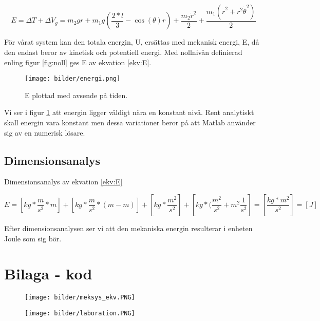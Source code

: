 \documentclass[a4paper,12pt]{article}
\begin{document}
\begin{equation}
E = \Delta{T} + \Delta{V_g} = m_2gr + m_1g(\frac{2*l}{3}-\cos(\theta)r) + \frac{m_2\dot{r}^2}{2} + \frac{m_1(\dot{r}^2+r^2\dot{\theta}^2)}{2}
\label{ekv:E}
\end{equation}

För vårat system kan den totala energin, U, ersättas med mekanisk energi, E, då den endast beror av kinetisk och potentiell energi. Med nollnivån definierad enling figur \ref{fig:noll} ges E av ekvation  \ref{ekv:E}.

\begin{figure}[h!]
\centering
\texttt{[image: bilder/energi.png]}
\caption{E plottad med avsende på tiden.}
\label{fig:energi}
\end{figure}

Vi ser i figur \ref{fig:energi} att energin ligger väldigt nära en konstant nivå. Rent analytiskt skall energin vara konstant men dessa variationer beror på att Matlab använder sig av en numerisk lösare.

\subsection*{Dimensionsanalys}
Dimensionsanalys av ekvation \ref{ekv:E}

\begin{equation}
E = [kg*\frac{m}{s^2}*m] + [kg*\frac{m}{s^2}*(m-m)] + [kg*\frac{m^2}{s^2}] + [kg*(\frac{m^2}{s^2} + m^2\frac{1}{s^2}] = [\frac{kg*m^2}{s^2}] = [J]
\label{ekv:E_dim}
\end{equation}

Efter dimensionsanalysen ser vi att den mekaniska energin resulterar i enheten Joule som sig bör.

\pagebreak
\section{Bilaga - kod}

\begin{figure}[ht]
\centering
\texttt{[image: bilder/meksys\_ekv.PNG]}
\label{fig:meksys}
\end{figure}

\begin{figure}[ht]
\centering
\texttt{[image: bilder/laboration.PNG]}
\label{fig:laboration}
\end{figure}
\end{document}
